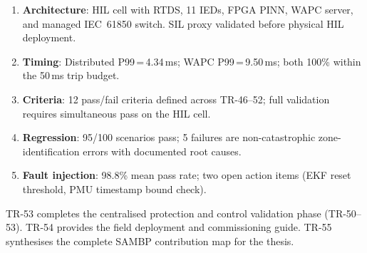 \documentclass[11pt,a4paper]{article}
\begin{document}
\begin{enumerate}
  \item \textbf{Architecture}: HIL cell with RTDS, 11 IEDs, FPGA PINN,
    WAPC server, and managed IEC~61850 switch.  SIL proxy validated
    before physical HIL deployment.

  \item \textbf{Timing}: Distributed P99\,=\,4.34\,ms; WAPC P99\,=\,9.50\,ms;
    both 100\% within the 50\,ms trip budget.

  \item \textbf{Criteria}: 12 pass/fail criteria defined across TR-46--52;
    full validation requires simultaneous pass on the HIL cell.

  \item \textbf{Regression}: 95/100 scenarios pass; 5 failures are
    non-catastrophic zone-identification errors with documented root causes.

  \item \textbf{Fault injection}: 98.8\% mean pass rate; two open action
    items (EKF reset threshold, PMU timestamp bound check).
\end{enumerate}

\noindent
TR-53 completes the centralised protection and control validation phase
(TR-50--53).  TR-54 provides the field deployment and commissioning guide.
TR-55 synthesises the complete SAMBP contribution map for the thesis.



\end{document}

